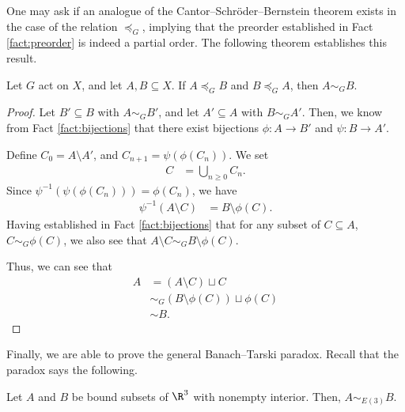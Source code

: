 One may ask if an analogue of the Cantor--Schröder--Bernstein theorem exists in the case of the relation $\preceq_{G}$, implying that the preorder established in Fact \ref{fact:preorder} is indeed a partial order. The following theorem establishes this result.
\begin{theorem}\label{thm:csb_for_equidecomposability}
  Let $G$ act on $X$, and let $A,B\subseteq X$. If $A\preceq_{G}B$ and $B\preceq_{G}A$, then $A\sim_{G}B$.
\end{theorem}
\begin{proof}
  Let $B'\subseteq B$ with $A\sim_{G}B'$, and let $A'\subseteq A$ with $B\sim_{G}A'$. Then, we know from Fact \ref{fact:bijections} that there exist bijections $\phi: A\rightarrow B'$ and $\psi: B\rightarrow A'$.\newline

  Define $C_0 = A\setminus A'$, and $C_{n+1} = \psi\left(\phi\left(C_n\right)\right)$. We set
  \begin{align*}
    C &= \bigcup_{n\geq 0}C_{n}.
  \end{align*}
  Since $\psi^{-1}\left(\psi\left(\phi\left(C_n\right)\right)\right) = \phi\left(C_n\right)$, we have
  \begin{align*}
    \psi^{-1}\left(A\setminus C\right) &= B\setminus \phi(C).
  \end{align*}
  Having established in Fact \ref{fact:bijections} that for any subset of $C\subseteq A$, $C\sim_{G} \phi(C)$, we also see that $A\setminus C \sim_{G} B\setminus \phi(C)$.\newline

  Thus, we can see that
  \begin{align*}
    A &= \left(A\setminus C\right)\sqcup C\\
      &\sim_{G}\left(B\setminus \phi(C)\right)\sqcup \phi(C)\\
      &\sim B.
  \end{align*}
  
\end{proof}
Finally, we are able to prove the general Banach--Tarski paradox. Recall that the paradox says the following.
\begin{proposition}
  Let $A$ and $B$ be bound subsets of $\R^3$ with nonempty interior. Then, $A\sim_{E(3)}B$.
\end{proposition}
